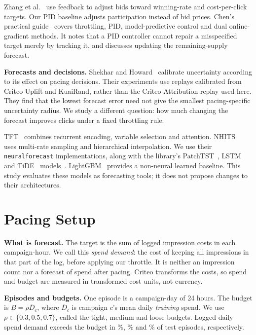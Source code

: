 \documentclass[sigconf,nonacm]{acmart}
\begin{document}
Zhang et al.~\cite{zhang2016feedback} use feedback to adjust bids toward
winning-rate and cost-per-click targets. Our PID baseline adjusts participation
instead of bid prices. Chen's practical guide~\cite{chen2025practical} covers
throttling, PID, model-predictive control and dual online-gradient methods. It
notes that a PID controller cannot repair a misspecified target merely by
tracking it, and discusses updating the remaining-supply forecast.

\textbf{Forecasts and decisions.} Shekhar and Howard~\cite{shekhar2026decision}
calibrate uncertainty according to its effect on pacing decisions. Their
experiments use replays calibrated from Criteo Uplift and KuaiRand, rather than
the Criteo Attribution replay used here. They find that the lowest forecast
error need not give the smallest pacing-specific uncertainty radius. We study
a different question: how much changing the forecast improves clicks under a
fixed throttling rule.

TFT~\cite{lim2021temporal} combines recurrent encoding, variable selection and
attention. NHITS~\cite{challu2023nhits} uses multi-rate sampling and hierarchical
interpolation. We use their \texttt{neuralforecast} implementations, along with
the library's PatchTST~\cite{nie2023patchtst}, LSTM~\cite{hochreiter1997lstm} and
TiDE~\cite{das2023tide} models~\cite{olivares2022neuralforecast}.
LightGBM~\cite{ke2017lightgbm} provides a non-neural learned baseline. This study
evaluates these models as forecasting tools; it does not propose changes to
their architectures.

\section{Pacing Setup}\label{sec:setup}

\textbf{What is forecast.} The target is the sum of logged impression costs in
each campaign-hour. We call this \emph{spend demand}: the cost of keeping all
impressions in that part of the log, before applying our throttle. It is neither
an impression count nor a forecast of spend after pacing. Criteo transforms
the costs, so spend and budget are measured in transformed cost units, not
currency.

\textbf{Episodes and budgets.} One episode is a campaign-day of 24 hours. The
budget is $B=\rho\bar D_c$, where $\bar D_c$ is campaign $c$'s mean daily
\emph{training} spend. We use $\rho\in\{0.3,0.5,0.7\}$, called the tight,
medium and loose budgets. Logged daily spend demand exceeds the budget in
\%, \% and
\% of test episodes, respectively.
\end{document}
